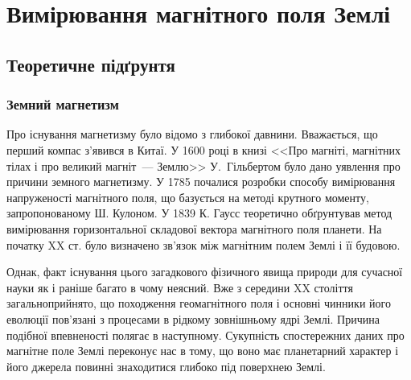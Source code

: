 
%
\expandafter\graphicspath\expandafter{\expandafter{\currfilebase/pic}}
\usetikzlibrary{arrows.meta}


\keywords{}


\chapter{Вимірювання магнітного поля Землі}
\makeworktitle


\section{Теоретичне підґрунтя}
\subsection{Земний магнетизм}

Про існування магнетизму було відомо з глибокої давнини. Вважається, що перший компас з'явився в Китаї. У 1600 році в книзі  <<Про магніті, магнітних тілах і про великий магніт~--- Землю>> У.~Гільбертом  було дано уявлення про причини земного магнетизму. У 1785 почалися розробки способу вимірювання напруженості магнітного поля, що базується на методі крутного моменту, запропонованому Ш. Кулоном. У 1839 К. Гаусс теоретично обґрунтував метод вимірювання горизонтальної складової вектора магнітного поля планети. На початку XX ст. було визначено зв'язок між магнітним полем Землі і її будовою. 

Однак, факт існування цього загадкового фізичного явища природи для сучасної науки як і раніше багато в чому неясний. Вже з середини XX століття загальноприйнято, що походження геомагнітного поля і основні чинники його еволюції пов'язані з процесами в рідкому зовнішньому ядрі Землі. Причина подібної впевненості полягає в наступному. Сукупність спостережних даних про магнітне поле Землі переконує нас в тому, що воно має планетарний характер і його джерела повинні знаходитися глибоко під поверхнею Землі. 

